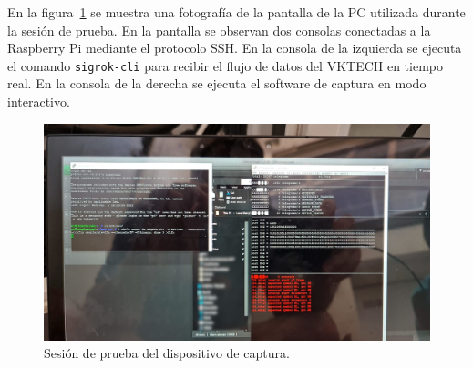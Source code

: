 En la figura~\ref{fig:disp-captura-ssh} se muestra una fotografía de la pantalla de la PC utilizada durante la sesión de prueba. En la pantalla se observan dos consolas conectadas a la Raspberry Pi mediante el protocolo SSH. En la consola de la izquierda se ejecuta el comando \texttt{sigrok-cli} para recibir el flujo de datos del VKTECH en tiempo real. En la consola de la derecha se ejecuta el software de captura en modo interactivo.

\begin{figure}[htbp]
	\centering
	\includegraphics[width=\textwidth]{./Figures/disp-captura-ssh.jpg}
	\caption{Sesión de prueba del dispositivo de captura.}
    \label{fig:disp-captura-ssh}
\end{figure}
